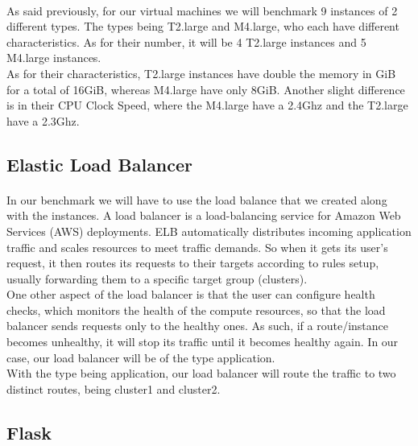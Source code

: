 \documentclass[12pt]{article}
\begin{document}
		\paragraph{} As said previously, for our virtual machines we will benchmark 9 instances 
		of 2 different types. The types being T2.large and M4.large, who each have different 
		characteristics. As for their number, it will be 4 T2.large instances and 5 M4.large instances. \\

  \noindent As for their characteristics, T2.large  instances have double the memory in GiB for a total of 16GiB,
		whereas M4.large have only 8GiB. Another slight difference is in their CPU Clock Speed, where the 
		M4.large have a 2.4Ghz and the T2.large have a 2.3Ghz.
		\bigskip

	\subsection{Elastic Load Balancer}
		\paragraph{} In our benchmark we will have to use the load balance that we created along with the instances.
		A load balancer is a load-balancing service for Amazon Web Services (AWS) deployments. ELB automatically 
		distributes incoming application traffic and scales resources to meet traffic demands. So when it gets its user's
		request, it then routes its requests to their targets according to rules setup, usually forwarding them
		to a specific target group (clusters). \\

	  \noindent One other aspect of the load balancer is that the user can configure health checks, which monitors the health of the 
		compute resources, so that the load balancer sends requests only to the healthy ones. As such, if a route/instance becomes
		unhealthy, it will stop its traffic until it becomes healthy again. In our case, our load balancer will be of the type 
		application. \\

	  \noindent With the type being application, our load balancer will route the traffic to two distinct routes, being cluster1 and cluster2.
		\bigskip

	\subsection{Flask}
\end{document}
